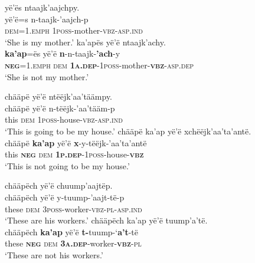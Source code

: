 \documentclass[output=paper,colorlinks,citecolor=brown,draft]{langscibook}
\begin{document}
\ea\label{ex:mix:45}
    \ea\label{ex:mix:45a}
        \glll  yë’ës ntaajk’aajchpy. \\ 
              yë’ë=s n-taajk-’aajch-p\\
             \textsc{dem=1.emph} \textsc{1poss-}mother-\textsc{vbz-asp.ind} \\
        \glt ‘She is my mother.’
    \ex\label{ex:mix:45b}
        \glll ka’apës yë’ë ntaajk’achy.\\
             \textbf{ka’ap}=ës yë’ë \textbf{n}{}-n-taajk-\textbf{’ach}{}-y\\
             \textbf{\textsc{neg}}\textsc{=1.emph} \textsc{dem} \textbf{\textsc{1a.dep}}\textsc{{}-1poss-}mother-\textbf{\textsc{vbz}}\textsc{{}-asp.dep}\\
        \glt ‘She is not my mother.’
    \z
\z 
 
\ea\label{ex:mix:46}
    \ea\label{ex:mix:46a}
        \glll chääpë yë’ë ntëëjk’aa’täämpy. \\ 
              chääpë yë’ë n-tëëjk-’aa’tääm-p\\
              this \textsc{dem} \textsc{1poss}{}-house-\textsc{vbz-asp.ind}\\
        \glt ‘This is going to be my house.’
    \ex\label{ex:mix:46b}
        \glll chääpë ka’ap yë’ë xchëëjk’aa’ta’antë. \\
             chääpë \textbf{ka’ap} yë’ë \textbf{x}{}-y-tëëjk-’aa’ta’antë\\
             this \textbf{\textsc{neg}} \textsc{dem} \textbf{\textsc{1p.dep}}{}-1\textsc{poss}{}-house-\textbf{\textsc{vbz}}\\
        \glt ‘This is not going to be my house.’
    \z
\z 
 
\ea\label{ex:mix:47}
    \ea\label{ex:mix:47a}
        \glll chääpëch yë’ë chuump’aajtëp.\\ 
              chääpëch yë’ë y-tuump-’aajt-të-p\\
              these \textsc{dem} \textsc{3poss}{}-worker-\textsc{vbz-pl-asp.ind}\\
        \glt ‘These are his workers.’
    \ex\label{ex:mix:47b}
        \glll chääpëch ka’ap yë’ë tuump’a’të.\\
             chääpëch \textbf{ka’ap} yë’ë \textbf{t-}tuump-‘\textbf{a’t}{}-të\\
             these \textbf{\textsc{neg}} \textsc{dem} \textbf{\textsc{3a.dep}}{}-worker-\textbf{\textsc{vbz}}\textsc{{}-pl}\\
        \glt ‘These are not his workers.’
    \z
\z 
\end{document}
